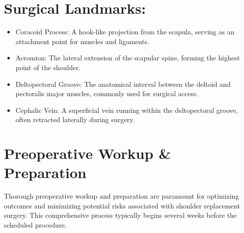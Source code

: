 \section{Surgical Landmarks:}
\begin{itemize}
  \item Coracoid Process: A hook-like projection from the scapula, serving as an attachment point for muscles and ligaments.
  \item Acromion: The lateral extension of the scapular spine, forming the highest point of the shoulder.
  \item Deltopectoral Groove: The anatomical interval between the deltoid and pectoralis major muscles, commonly used for surgical access.
  \item Cephalic Vein: A superficial vein running within the deltopectoral groove, often retracted laterally during surgery.
\end{itemize}

\section*{Preoperative Workup \& Preparation}
Thorough preoperative workup and preparation are paramount for optimizing outcomes and minimizing potential risks associated with shoulder replacement surgery. This comprehensive process typically begins several weeks before the scheduled procedure.

